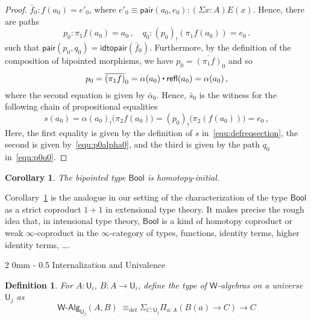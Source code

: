 \documentclass[reqno,10pt,a4paper,oneside]{amsart}
\makeatletter
\numberwithin{equation}{section}
\renewcommand{\subsection}{\@startsection
  {subsection}%
  {2}%
  {0mm}%
  {-\baselineskip}%
  {0.5\baselineskip}%
  {\normalfont\normalsize\bf}}%
\theoremstyle{mythm}
\newtheorem{corollary}[theorem]{Corollary}
\theoremstyle{mydef}
\newtheorem{definition}[theorem]{Definition}
\theoremstyle{myrmk}
\newcommand{\deq}{\equiv}
\newcommand{\peq}{=}
\newcommand{\defeq}{\deq_{\mathrm{def}}}
\newcommand{\co}{\colon}
\newcommand{\ct}{%
  \mathchoice{\mathbin{\raisebox{0.5ex}{$\displaystyle\centerdot$}}}%
             {\mathbin{\raisebox{0.5ex}{$\centerdot$}}}%
             {\mathbin{\raisebox{0.25ex}{$\scriptstyle\,\centerdot\,$}}}%
             {\mathbin{\raisebox{0.1ex}{$\scriptscriptstyle\,\centerdot\,$}}}}
\newcommand{\prd}[1]{\Pi_{#1}}
\newcommand{\sm}[1]{\Sigma_{#1}}
\newcommand{\pair}{\mathsf{pair}}
\newcommand{\refl}{\mathsf{refl}}
\newcommand{\W}{\mathsf{W}}
\newcommand{\Bool}{\mathsf{Bool}}
\newcommand{\UU}{\mathsf{U}}
\newcommand{\WAlg}{\mathsf{W}\text{-}\mathsf{Alg}}
\makeatother
\begin{document}
\begin{proof}
$\bar{f}_0 \co f(a_0) \peq e'_0$, where $e'_0 \equiv \pair(a_0, e_0) \co (\Sigma x :A ) E(x)$. Hence, there are paths 
\begin{equation}
\label{equ:p0q0}
p_0 \co \pi_1 f (a_0) \peq a_0 \, , \quad q_0 \co (p_0)_{!}( \pi_1 f (a_0)) \peq e_0 \, . 
\end{equation}
such that $\pair(p_0, q_0) \peq \mathsf{idtopair}(\bar{f}_0)$. Furthermore, by the definition of the composition of bipointed morphisms, we have
$p_0 =  \overline{(\pi_1 f)}_0$ and so
\begin{equation}
\label{equ:p0alpha0}
p_0 = \overline{(\pi_1 f)}_0 =  \alpha(a_0) \ct \refl(a_0)  = \alpha(a_0) \, ,
\end{equation}
where the second equation is given by $\bar{\alpha}_0$. Hence, $\bar{s}_0$ is the witness for the following chain of propositional equalities
\[
s(a_0) \peq \alpha(a_0)_{!} \big( \pi_2 f(a_0)  \big)  
              \peq  (  p_0   )_{!} \big( \pi_2(f(a_0) ) \big) 
               \peq  e_0 \, ,
\]
Here, the first equality is given by the definition of $s$ in~\eqref{equ:defreqsection}, the second is given by~\eqref{equ:p0alpha0}, and the third is given by the path $q_0$ in~\eqref{equ:p0q0}.
\end{proof}


\begin{corollary}\label{lem:BoolInitInt}
The bipointed type $\Bool$ is homotopy-initial.
\end{corollary}


Corollary~\ref{lem:BoolInitInt} is the analogue in our setting of the characterization of 
the type $\Bool$ as a strict coproduct $1+1$ in extensional type theory. It makes precise the rough idea that, 
in intensional type theory, $\Bool$ is a kind of homotopy coproduct or weak $\infty$-coproduct 
in the $\infty$-category of types, functions, identity terms, higher identity terms, \ldots.  



\subsection{Internalization and Univalence}

\begin{definition}\label{def:WAlg}
For $A:\UU_i$, $B : A \to \UU_i$, define the type of \emph{$\W$-algebras} on a universe $\UU_j$ as
\[\WAlg_{\UU_j}(A,B) \; \defeq \sm{C : \UU_j} \prd{a:A} (B(a) \to C) \to C \]
\end{definition}
\end{document}
